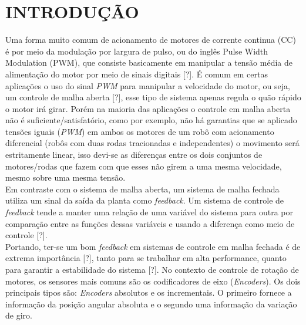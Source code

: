 \section{INTRODUÇÃO}

Uma forma muito comum de acionamento de motores de corrente continua (CC) é por meio da modulação por largura de pulso, ou do inglês Pulse Width Modulation (PWM), que consiste basicamente em manipular a tensão média de alimentação do motor por meio de sinais digitais [?]. É comum em certas aplicações o uso do sinal \emph{PWM} para manipular a velocidade do motor, ou seja, um controle de malha aberta [?], esse tipo de sistema apenas regula o quão rápido o motor irá girar. Porém na maioria das aplicações o controle em malha aberta não é suficiente/satisfatório, como por exemplo, não há garantias que se aplicado tensões iguais (\emph{PWM}) em ambos os motores de um robô com acionamento diferencial (robôs com duas rodas tracionadas e independentes) o movimento será estritamente linear, isso devi-se as diferenças entre os dois conjuntos de motores/rodas que fazem com que esses não girem a uma mesma velocidade, mesmo sobre uma mesma tensão.\\

Em contraste com o sistema de malha aberta, um sistema de malha fechada utiliza um sinal da saída da planta como \emph{feedback}. Um sistema de controle de \emph{feedback} tende a manter uma relação de uma variável do sistema para outra por comparação entre as funções dessas variáveis e usando a diferença como meio de controle [?]. \\

Portando, ter-se um bom \emph{feedback} em sistemas de controle em malha fechada é de extrema importância [?], tanto para se trabalhar em alta performance, quanto para garantir a estabilidade do sistema [?]. No contexto de controle de rotação de motores, os sensores mais comuns são os codificadores de eixo (\emph{Encoders}). Os dois principais tipos são: \emph{Encoders} absolutos e os incrementais. O primeiro fornece a informação da posição angular absoluta e o segundo uma informação da variação de giro. \\

